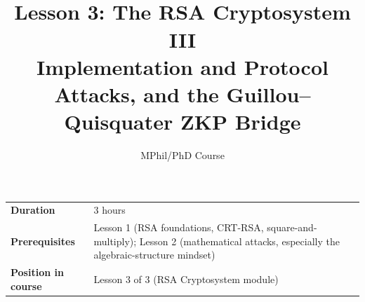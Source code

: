 \documentclass[11pt]{article}
\title{\textbf{\seriestitle} \\ \Large Lesson 3: The RSA Cryptosystem III \\ \large Implementation and Protocol Attacks, and the Guillou--Quisquater ZKP Bridge}
\author{MPhil/PhD Course}
\date{}
\begin{document}
\maketitle

\begin{center}
\begin{tabular}{ll}
\toprule
\textbf{Duration} & 3 hours \\
\textbf{Prerequisites} & Lesson 1 (RSA foundations, CRT-RSA, square-and-multiply); Lesson 2 (mathematical attacks, especially the algebraic-structure mindset) \\
\textbf{Position in course} & Lesson 3 of 3 (RSA Cryptosystem module) \\
\bottomrule
\end{tabular}
\end{center}



\end{document}
